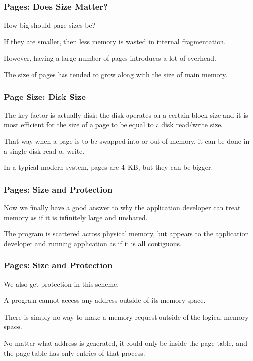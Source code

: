 \begin{frame}
\frametitle{Pages: Does Size Matter?}

How big should page sizes be? 

If they are smaller, then less memory is wasted in internal fragmentation. 

However, having a large number of pages introduces a lot of overhead. 

The size of pages has tended to grow along with the size of main memory.

\end{frame}

\begin{frame}
\frametitle{Page Size: Disk Size}

The key factor is actually disk: the disk operates on a certain block size and it is most efficient for the size of a page to be equal to a disk read/write size. 

That way when a page is to be swapped into or out of memory, it can be done in a single disk read or write. 

In a typical modern system, pages are 4~KB, but they can be bigger.

\end{frame}

\begin{frame}
\frametitle{Pages: Size and Protection}

Now we finally have a good answer to why the application developer can treat memory as if it is infinitely large and unshared. 

The program is scattered across physical memory, but appears to the application developer and running application as if it is all contiguous. 

\end{frame}


\begin{frame}
\frametitle{Pages: Size and Protection}

We also get protection in this scheme.

A program cannot access any address outside of its memory space. 

There is simply no way to make a memory request outside of the logical memory space. 

No matter what address is generated, it could only be inside the page table, and the page table has only entries of that process.

\end{frame}

